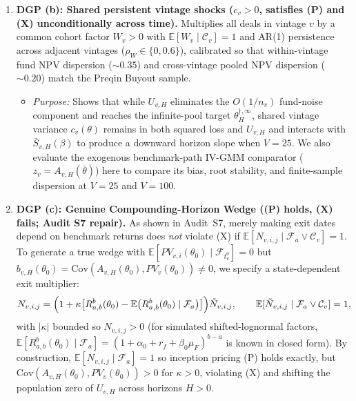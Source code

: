 \documentclass[11pt]{article}
\newcommand{\E}{\mathbb{E}}
\newcommand{\Cov}{\mathrm{Cov}}
\newcommand{\C}{\mathcal{C}}
\newcommand{\F}{\mathcal{F}}
\begin{document}
\begin{enumerate}[label=(\alph*)]
\item \textbf{DGP (b): Shared persistent vintage shocks ($c_v>0$, satisfies (P) and (X) unconditionally across time).} Multiplies all deals in vintage $v$ by a common cohort factor $W_v>0$ with $\E[W_v\mid\C_v]=1$ and AR(1) persistence across adjacent vintages ($\rho_W\in\{0,0.6\}$), calibrated so that within-vintage fund NPV dispersion ($\sim 0.35$) and cross-vintage pooled NPV dispersion ($\sim 0.20$) match the Preqin Buyout sample.
\begin{itemize}
\item \emph{Purpose:} Shows that while $U_{v,H}$ eliminates the $O(1/n_v)$ fund-noise component and reaches the infinite-pool target $\theta_H^{\dagger,\infty}$, shared vintage variance $c_v(\theta)$ remains in both squared loss and $U_{v,H}$ and interacts with $\bar S_{v,H}(\beta)$ to produce a downward horizon slope when $V=25$. We also evaluate the exogenous benchmark-path IV-GMM comparator ($z_v=A_{v,H}(\bar\theta)$) here to compare its bias, root stability, and finite-sample dispersion at $V=25$ and $V=100$.
\end{itemize}

\item \textbf{DGP (c): Genuine Compounding-Horizon Wedge ((P) holds, (X) fails; Audit S7 repair).} As shown in Audit~S7, merely making exit dates depend on benchmark returns does \emph{not} violate (X) if $\E[N_{v,i,j}\mid\F_a\vee\C_v]=1$. To generate a true wedge with $\E[PV_{v,i}(\theta_0)\mid\F_{t_v^0}]=0$ but $b_{v,H}(\theta_0)=\Cov(A_{v,H}(\theta_0),PV_v(\theta_0))\neq 0$, we specify a state-dependent exit multiplier:
\[
N_{v,i,j}=\Bigl(1+\kappa\bigl[R^b_{a,b}(\theta_0)-\E\bigl(R^b_{a,b}(\theta_0)\mid\F_a\bigr)\bigr]\Bigr)\tilde N_{v,i,j},\qquad \E[\tilde N_{v,i,j}\mid\F_a\vee\C_v]=1,
\]
with $|\kappa|$ bounded so $N_{v,i,j}>0$ (for simulated shifted-lognormal factors, $\E[R^b_{a,b}(\theta_0)\mid\F_a]=(1+\alpha_0+r_f+\beta_0\mu_F)^{b-a}$ is known in closed form). By construction, $\E[N_{v,i,j}\mid\F_a]=1$ so inception pricing (P) holds exactly, but $\Cov(A_{v,H}(\theta_0),PV_v(\theta_0))>0$ for $\kappa>0$, violating (X) and shifting the population zero of $U_{v,H}$ across horizons $H>0$.
\end{enumerate}
\end{document}
